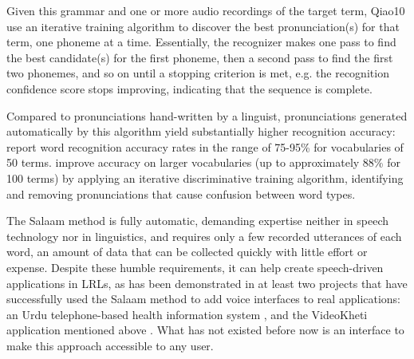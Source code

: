 \documentclass[11pt]{article}
\begin{document}
Given this grammar and one or more audio recordings of the target term, 
\newcite
{Qiao10} 
use an iterative training algorithm to discover the best pronunciation(s) for that term, one phoneme at a time. 
Essentially, the recognizer makes one pass to find the best candidate(s) for the first phoneme, then a second pass to find the first two phonemes, and so on until a stopping criterion is met, e.g. the recognition confidence score 
stops improving, %
indicating that the sequence is complete.

Compared to pronunciations hand-written by a linguist, pronunciations generated automatically by this algorithm yield substantially higher recognition accuracy: %
 report word recognition accuracy rates in the range of 75-95\% for vocabularies of 50 terms.
 improve accuracy on larger vocabularies (up to approximately 88\% for 100 terms) by applying an iterative discriminative training algorithm, identifying and removing pronunciations that cause confusion between word types.

The Salaam method is fully automatic, demanding expertise neither in speech technology 
nor in linguistics,
and requires only a few recorded utterances of each word,
an amount of data that can be collected quickly with little effort or expense. 
Despite these humble requirements, it 
can help create speech-driven applications in LRLs, as has been demonstrated in at least two projects that have successfully used the Salaam method to add voice interfaces to real applications: an Urdu telephone-based health information system \cite{Sherwani09}, and
the VideoKheti application mentioned above \cite{bali13}.
What has not existed before now is an interface to make this approach accessible to any user.
\end{document}
